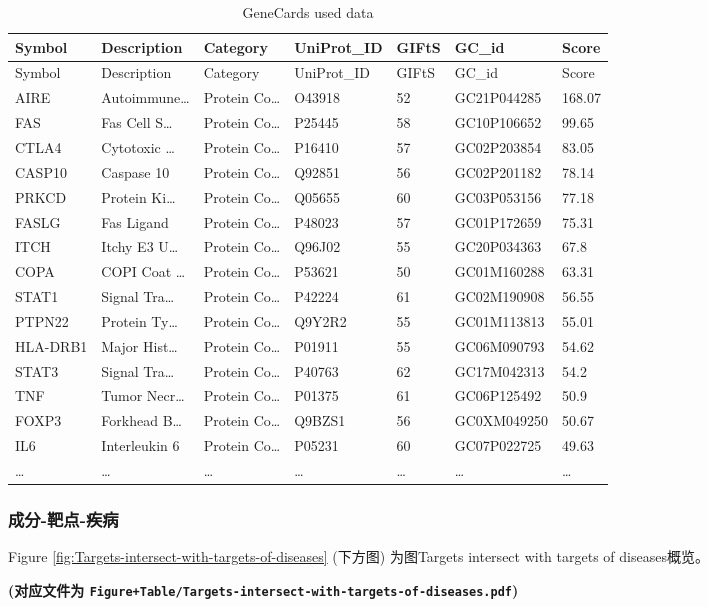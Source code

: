 \documentclass[
]{article}
\begin{document}
\begin{longtable}[]{@{}lllllll@{}}
\caption{\label{tab:GeneCards-used-data}GeneCards used data}\tabularnewline
\toprule
Symbol & Description & Category & UniProt\_ID & GIFtS & GC\_id & Score\tabularnewline
\midrule
\endfirsthead
\toprule
Symbol & Description & Category & UniProt\_ID & GIFtS & GC\_id & Score\tabularnewline
\midrule
\endhead
AIRE & Autoimmune\ldots{} & Protein Co\ldots{} & O43918 & 52 & GC21P044285 & 168.07\tabularnewline
FAS & Fas Cell S\ldots{} & Protein Co\ldots{} & P25445 & 58 & GC10P106652 & 99.65\tabularnewline
CTLA4 & Cytotoxic \ldots{} & Protein Co\ldots{} & P16410 & 57 & GC02P203854 & 83.05\tabularnewline
CASP10 & Caspase 10 & Protein Co\ldots{} & Q92851 & 56 & GC02P201182 & 78.14\tabularnewline
PRKCD & Protein Ki\ldots{} & Protein Co\ldots{} & Q05655 & 60 & GC03P053156 & 77.18\tabularnewline
FASLG & Fas Ligand & Protein Co\ldots{} & P48023 & 57 & GC01P172659 & 75.31\tabularnewline
ITCH & Itchy E3 U\ldots{} & Protein Co\ldots{} & Q96J02 & 55 & GC20P034363 & 67.8\tabularnewline
COPA & COPI Coat \ldots{} & Protein Co\ldots{} & P53621 & 50 & GC01M160288 & 63.31\tabularnewline
STAT1 & Signal Tra\ldots{} & Protein Co\ldots{} & P42224 & 61 & GC02M190908 & 56.55\tabularnewline
PTPN22 & Protein Ty\ldots{} & Protein Co\ldots{} & Q9Y2R2 & 55 & GC01M113813 & 55.01\tabularnewline
HLA-DRB1 & Major Hist\ldots{} & Protein Co\ldots{} & P01911 & 55 & GC06M090793 & 54.62\tabularnewline
STAT3 & Signal Tra\ldots{} & Protein Co\ldots{} & P40763 & 62 & GC17M042313 & 54.2\tabularnewline
TNF & Tumor Necr\ldots{} & Protein Co\ldots{} & P01375 & 61 & GC06P125492 & 50.9\tabularnewline
FOXP3 & Forkhead B\ldots{} & Protein Co\ldots{} & Q9BZS1 & 56 & GC0XM049250 & 50.67\tabularnewline
IL6 & Interleukin 6 & Protein Co\ldots{} & P05231 & 60 & GC07P022725 & 49.63\tabularnewline
\ldots{} & \ldots{} & \ldots{} & \ldots{} & \ldots{} & \ldots{} & \ldots{}\tabularnewline
\bottomrule
\end{longtable}

\hypertarget{ux6210ux5206-ux9776ux70b9-ux75beux75c5}{%
\subsubsection{成分-靶点-疾病}\label{ux6210ux5206-ux9776ux70b9-ux75beux75c5}}

Figure \ref{fig:Targets-intersect-with-targets-of-diseases} (下方图) 为图Targets intersect with targets of diseases概览。

\textbf{(对应文件为 \texttt{Figure+Table/Targets-intersect-with-targets-of-diseases.pdf})}
\end{document}
